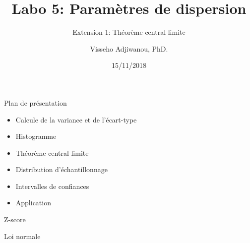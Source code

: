 \documentclass[ignorenonframetext,]{beamer}
\title{Labo 5: Paramètres de dispersion}
\subtitle{Extension 1: Théorème central limite}
\author{Visseho Adjiwanou, PhD.}
\date{15/11/2018}
\providecommand{\tightlist}{%
  \setlength{\itemsep}{0pt}\setlength{\parskip}{0pt}}
\begin{document}
\frame{\titlepage}

\begin{frame}{Plan de présentation}

\begin{itemize}
\tightlist
\item
  Calcule de la variance et de l'écart-type
\item
  Histogramme
\item
  Théorème central limite
\item
  Distribution d'échantillonnage
\item
  Intervalles de confiances
\item
  Application
\end{itemize}

\end{frame}

\begin{frame}{Z-score}

\end{frame}

\begin{frame}{Loi normale}

\end{frame}
\end{document}

